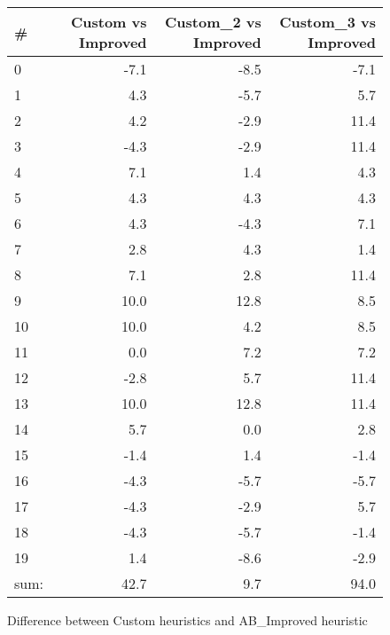 \documentclass[12pt, a4paper]{article}
\begin{document}
\begin{figure}
  \centering
\begin{tabular}{lrrr}
\toprule
\# &  Custom vs Improved &  Custom\_2 vs Improved &  Custom\_3 vs Improved \\
\midrule
0  &                -7.1 &                  -8.5 &                  -7.1 \\
1  &                 4.3 &                  -5.7 &                   5.7 \\
2  &                 4.2 &                  -2.9 &                  11.4 \\
3  &                -4.3 &                  -2.9 &                  11.4 \\
4  &                 7.1 &                   1.4 &                   4.3 \\
5  &                 4.3 &                   4.3 &                   4.3 \\
6  &                 4.3 &                  -4.3 &                   7.1 \\
7  &                 2.8 &                   4.3 &                   1.4 \\
8  &                 7.1 &                   2.8 &                  11.4 \\
9  &                10.0 &                  12.8 &                   8.5 \\
10 &                10.0 &                   4.2 &                   8.5 \\
11 &                 0.0 &                   7.2 &                   7.2 \\
12 &                -2.8 &                   5.7 &                  11.4 \\
13 &                10.0 &                  12.8 &                  11.4 \\
14 &                 5.7 &                   0.0 &                   2.8 \\
15 &                -1.4 &                   1.4 &                  -1.4 \\
16 &                -4.3 &                  -5.7 &                  -5.7 \\
17 &                -4.3 &                  -2.9 &                   5.7 \\
18 &                -4.3 &                  -5.7 &                  -1.4 \\
19 &                 1.4 &                  -8.6 &                  -2.9 \\
\bottomrule
\bottomrule
sum:   &                42.7 &                   9.7 &                  94.0 \\
\bottomrule

\end{tabular}
\caption{Difference between Custom heuristics and AB\_Improved heuristic}
\label{fig-tab-tournament-result-diffs}
\end{figure}
\end{document}

